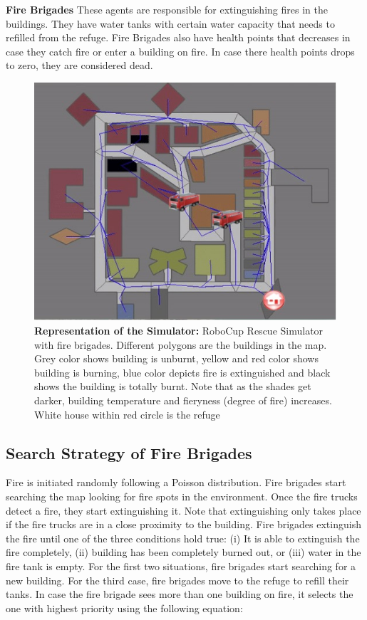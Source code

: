 \documentclass[12pt]{report}
\begin{document}
\textbf{Fire Brigades} These agents are responsible for extinguishing fires in the buildings. They have water tanks with certain water capacity that needs to refilled from the refuge. Fire Brigades also have health points that decreases in case they catch fire or enter a building on fire. In case there health points drops to zero, they are considered dead. 

\hfill

\begin{figure}[!h]
    \centering
    \includegraphics[width=12cm]{RCRSRep.jpg}
    \caption{\textbf{Representation of the Simulator:} RoboCup Rescue Simulator with fire brigades. Different polygons are the buildings in the map. Grey color shows building is unburnt, yellow and red color shows building is burning, blue color depicts fire is extinguished and black shows the building is totally burnt. Note that as the shades get darker, building temperature and fieryness (degree of fire) increases. White house within red circle is the refuge}
    \label{fig:RepresentationofSimulator}
\end{figure}

\subsection{Search Strategy of Fire Brigades}

Fire is initiated randomly following a Poisson distribution. Fire brigades start searching the map looking for fire spots in the environment. Once the fire trucks detect a fire, they start extinguishing it. Note that extinguishing only takes place if the fire trucks are in a close proximity to the building. Fire brigades extinguish the fire until one of the three conditions hold true: (i) It is able to extinguish the fire completely, (ii) building has been completely burned out, or (iii) water in the fire tank is empty. For the first two situations, fire brigades start searching for a new building. For the third case, fire brigades move to the refuge to refill their tanks. In case the fire brigade sees more than one building on fire, it selects the one with highest priority using the following equation: 
\end{document}
